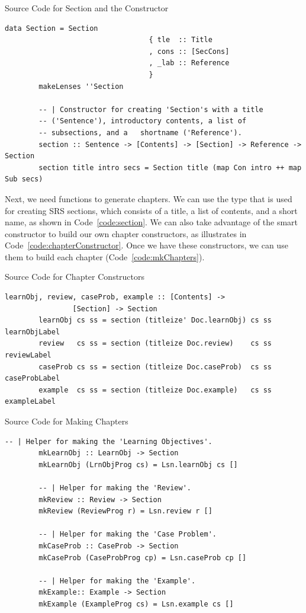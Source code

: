 \begin{listing}[h!]
	\caption{Source Code for Section and the Constructor}
	\label{code:section}
	\begin{lstlisting}[language=haskell1]
		data Section = Section
								  { tle  :: Title
								  , cons :: [SecCons]
								  , _lab :: Reference
								  }
		makeLenses ''Section
		
		-- | Constructor for creating 'Section's with a title 
		-- ('Sentence'), introductory contents, a list of 
		-- subsections, and a	shortname ('Reference').
		section :: Sentence -> [Contents] -> [Section] -> Reference -> Section
		section title intro secs = Section title (map Con intro ++ map Sub secs)
	\end{lstlisting}
\end{listing}

Next, we need functions to generate chapters. We can use the  
type that is used for creating SRS sections, which consists of a title, a list 
of contents, and a short name, as shown in Code~\ref{code:section}. We can also 
take advantage of the  smart constructor to build our own 
chapter constructors, as illustrates in Code~\ref{code:chapterConstructor}. 
Once we have these constructors, we can use them to build each chapter 
(Code~\ref{code:mkChapters}).

\begin{listing}[h!]
	\caption{Source Code for Chapter Constructors} 
	\label{code:chapterConstructor}
	\begin{lstlisting}[language=haskell1]
		learnObj, review, caseProb, example :: [Contents] -> 
				[Section] -> Section
		learnObj cs ss = section (titleize' Doc.learnObj) cs ss learnObjLabel
		review   cs ss = section (titleize Doc.review)    cs ss reviewLabel
		caseProb cs ss = section (titleize Doc.caseProb)  cs ss caseProbLabel
		example  cs ss = section (titleize Doc.example)   cs ss exampleLabel
	\end{lstlisting}
\end{listing}

\begin{listing}[h!]
	\caption{Source Code for Making Chapters} 
	\label{code:mkChapters}
	\begin{lstlisting}[language=haskell1]				
		-- | Helper for making the 'Learning Objectives'.
		mkLearnObj :: LearnObj -> Section
		mkLearnObj (LrnObjProg cs) = Lsn.learnObj cs []
		
		-- | Helper for making the 'Review'.
		mkReview :: Review -> Section
		mkReview (ReviewProg r) = Lsn.review r [] 
		
		-- | Helper for making the 'Case Problem'.
		mkCaseProb :: CaseProb -> Section
		mkCaseProb (CaseProbProg cp) = Lsn.caseProb cp [] 
		
		-- | Helper for making the 'Example'.
		mkExample:: Example -> Section
		mkExample (ExampleProg cs) = Lsn.example cs []
	\end{lstlisting}
\end{listing}

